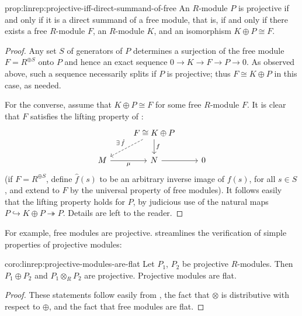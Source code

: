 \begin{prop}{}{prop:linrep:projective-iff-direct-summand-of-free}
  An $R$-module $P$ is projective if and only if it is a direct
  summand of a free module, that is, if and only if there exists a
  free $R$-module $F$, an $R$-module $K$, and an isomorphism
  $K \oplus P \cong F$.
\end{prop}

\begin{proof}
  Any set $S$ of generators of $P$ determines a surjection of the free
  module $F = R^{\oplus S}$ onto $P$ and hence an exact sequence
  $0 \to K \to F \to P \to 0$. As observed above, such a sequence
  necessarily splits if $P$ is projective; thus $F \cong K \oplus P$
  in this case, as needed.

  For the converse, assume that $K \oplus P \cong F$ for some free
  $R$-module $F$. It is clear that $F$ satisfies the lifting property
  of :
  \[
    \begin{tikzcd}
      & F \cong K \oplus P \ar[d, "f"] \ar[dl, dashed,
      "\exists\,\hat{f}"'] \\
      M \ar[r, "\mu"'] & N \ar[r] & 0
    \end{tikzcd}
  \]
  (if $F = R^{\oplus S}$, define $\hat{f}(s)$ to be an arbitrary
  inverse image of $f(s)$, for all $s \in S$, and extend to $F$ by the
  universal property of free modules). It follows easily that the
  lifting property holds for $P$, by judicious use of the natural maps
  $P \hookrightarrow K \oplus P \twoheadrightarrow P$. Details are
  left to the reader.
\end{proof}

For example, free modules are projective.
 streamlines the verification of simple
properties of projective modules:

\begin{coro}{}{coro:linrep:projective-modules-are-flat}
  Let $P_1$, $P_2$ be projective $R$-modules. Then $P_1 \oplus P_2$
  and $P_1 \otimes_R P_2$ are projective. Projective modules are flat.
\end{coro}

\begin{proof}
  These statements follow easily from ,
  the fact that $\otimes$ is distributive with respect to $\oplus$,
  and the fact that free modules are flat.
\end{proof}

